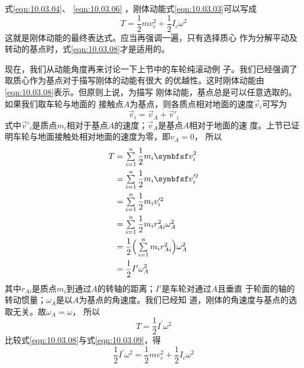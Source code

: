 \noindent
式\eqref{eqn:10.03.04}、 \eqref{eqn:10.03.06} ，刚体动能\lhbrak 式\eqref{eqn:10.03.03}\rhbrak 可以写成
\begin{equation}\label{eqn:10.03.08}
    T = \frac { 1 } { 2 } m v _ { c } ^ { 2 } + \frac { 1 } { 2 } I _ { c } \omega ^ { 2 }
\end{equation}
这就是刚体动能的最终表达式。应当再强调一遍，只有选择质心
作为分解平动及转动的基点时，式\eqref{eqn:10.03.08}才是适用的。

现在，我们从动能角度再来讨论一下上节中的车轮纯滚动例
子。我们已经强调了取质心作为基点对于描写刚体的动能有很大
的优越性。这时刚体动能由\eqref{eqn:10.03.08}表示。但原则上说，为描写
刚体动能，基点总是可以任意选取的。如果我们取车轮与地面的
接触点$ A $为基点，则各质点相对地面的速度$ \vec{v} _ i $可写为
\begin{equation*}
    \vec{v} _ i = \vec{v} _ { A } + \vec{v}' _ i
\end{equation*}
式中$ \vec{v}' _ i $是质点$ m _ i $相对于基点$ A $的速度；$ \vec{v} _ A $是基点$ A $相对于地面的速
度。上节已证明车轮与地面接触处相对地面的速度为零，即$  v _ { A } =
0$， 所以
\begin{equation*}
    \begin{split}
    T &=\sumx_{i=1}^{n} \dfrac{1}{2} m_{i} \vec{v}_{i}^{2} \\
    &=\sumx_{i=1}^{n} \dfrac{1}{2} m_{i} \vec{v}_{i}^{\prime 2} \\
    &=\sumx_{i=1}^{n} \dfrac{1}{2} m_{i} v_{i}^{\prime 2} \\
    &=\sumx_{i=1}^{n} \dfrac{1}{2} m_{i} r^{2}_{Ai} \omega_{A}^{2} \\
    &=\dfrac{1}{2}\Big(\sumx_{i=1}^{n} m_{i} r_{Ai}^{2}\Big) \omega_{A}^{2} \\
    &=\dfrac{1}{2} I^{\prime} \omega_{A}^{2}
    \end{split}
\end{equation*}
其中$ r_{Ai} $是质点$ m _ i $到通过$ A $的转轴的距离；$ I' $是车轮对通过$ A $且垂直
于轮面的轴的转动惯量；$ \omega_{A} $是以$ A $为基点的角速度。我们已经知
道，刚体的角速度与基点的选取无关。故$  \omega _ { A } = \omega  $， 所以\vspace{-1.56em}
\begin{equation}\label{eqn:10.03.09}
    T = \frac { 1 } { 2 } I ^ { \prime } \omega ^ { 2 }
\end{equation}
比较式\eqref{eqn:10.03.08}与式\eqref{eqn:10.03.09}，得
\begin{equation*}
    \frac { 1 } { 2 } I ^ { \prime } \omega ^ { 2 } = \frac { 1 } { 2 } m v _ { c } ^ { 2 } + \frac { 1 } { 2 } I _ { c } \omega ^ { 2 }
\end{equation*}
